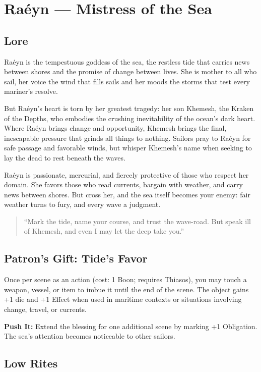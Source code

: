 \section{Raéyn --- Mistress of the Sea}
\label{patron:raeyn}

\subsection*{Lore}
%
Raéyn is the tempestuous goddess of the sea, the restless tide that carries news between shores and the promise of change between lives. She is mother to all who sail, her voice the wind that fills sails and her moods the storms that test every mariner's resolve.

But Raéyn's heart is torn by her greatest tragedy: her son Khemesh, the Kraken of the Depths, who embodies the crushing inevitability of the ocean's dark heart. Where Raéyn brings change and opportunity, Khemesh brings the final, inescapable pressure that grinds all things to nothing. Sailors pray to Raéyn for safe passage and favorable winds, but whisper Khemesh's name when seeking to lay the dead to rest beneath the waves.

Raéyn is passionate, mercurial, and fiercely protective of those who respect her domain. She favors those who read currents, bargain with weather, and carry news between shores. But cross her, and the sea itself becomes your enemy: fair weather turns to fury, and every wave a judgment.

\begin{quote}
``Mark the tide, name your course, and trust the wave-road. But speak ill of Khemesh, and even I may let the deep take you.''
\end{quote}

\subsection*{Patron's Gift: Tide's Favor}
Once per scene as an action (cost: 1 Boon; requires Thiasos), you may touch a weapon, vessel, or item to imbue it until the end of the scene. The object gains +1 die and +1 Effect when used in maritime contexts or situations involving change, travel, or currents.  

\textbf{Push It:} Extend the blessing for one additional scene by marking +1 Obligation. The sea's attention becomes noticeable to other sailors.

\subsection*{Low Rites}
